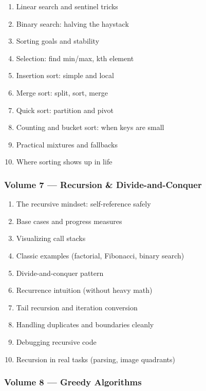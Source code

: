 \documentclass[
  letterpaper,
  DIV=11,
  numbers=noendperiod]{scrreprt}
\providecommand{\tightlist}{%
  \setlength{\itemsep}{0pt}\setlength{\parskip}{0pt}}
\begin{document}
\begin{enumerate}
\def\labelenumi{\arabic{enumi}.}
\setcounter{enumi}{50}
\tightlist
\item
  Linear search and sentinel tricks
\item
  Binary search: halving the haystack
\item
  Sorting goals and stability
\item
  Selection: find min/max, kth element
\item
  Insertion sort: simple and local
\item
  Merge sort: split, sort, merge
\item
  Quick sort: partition and pivot
\item
  Counting and bucket sort: when keys are small
\item
  Practical mixtures and fallbacks
\item
  Where sorting shows up in life
\end{enumerate}

\subsubsection{Volume 7 --- Recursion \&
Divide-and-Conquer}\label{volume-7-recursion-divide-and-conquer}

\begin{enumerate}
\def\labelenumi{\arabic{enumi}.}
\setcounter{enumi}{60}
\tightlist
\item
  The recursive mindset: self-reference safely
\item
  Base cases and progress measures
\item
  Visualizing call stacks
\item
  Classic examples (factorial, Fibonacci, binary search)
\item
  Divide-and-conquer pattern
\item
  Recurrence intuition (without heavy math)
\item
  Tail recursion and iteration conversion
\item
  Handling duplicates and boundaries cleanly
\item
  Debugging recursive code
\item
  Recursion in real tasks (parsing, image quadrants)
\end{enumerate}

\subsubsection{Volume 8 --- Greedy
Algorithms}\label{volume-8-greedy-algorithms}
\end{document}
